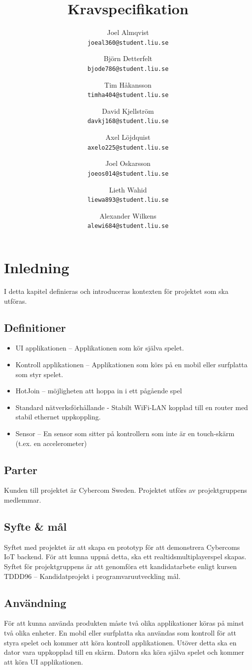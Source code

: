 \documentclass[10pt]{article}
\title{Kravspecifikation}
\author{
    Joel Almqvist\\
    \texttt{joeal360@student.liu.se}
    \and
    Björn Detterfelt\\
    \texttt{bjode786@student.liu.se}
    \and
    Tim Håkansson\\
    \texttt{timha404@student.liu.se}
    \and
    David Kjellström\\
    \texttt{davkj168@student.liu.se}
    \and
    Axel Löjdquist\\
    \texttt{axelo225@student.liu.se}
    \and
    Joel Oskarsson\\
    \texttt{joeos014@student.liu.se}
    \and
    Lieth Wahid\\
    \texttt{liewa893@student.liu.se}
    \and
    Alexander Wilkens\\
    \texttt{alewi684@student.liu.se}
}
\begin{document}
\maketitle
\pagebreak
\tableofcontents
\pagebreak
\section{Inledning}
	I detta kapitel definieras och introduceras kontexten för projektet som ska utföras.

	\subsection{Definitioner}
		\begin{itemize}
		\item UI applikationen -- Applikationen som kör själva spelet.
		\item Kontroll applikationen -- Applikationen som körs på en mobil eller surfplatta som styr spelet.
		\item HotJoin -- möjligheten att hoppa in i ett pågående spel
		\item Standard nätverksförhållande - Stabilt WiFi-LAN kopplad till en router med stabil ethernet uppkoppling.
		\item Sensor -- En sensor som sitter på kontrollern som inte är en touch-skärm (t.ex. en accelerometer)
		\end{itemize}	

	\subsection{Parter}
	Kunden till projektet är Cybercom Sweden. Projektet utförs av projektgruppens medlemmar.
	
	\subsection{Syfte \& mål}
		Syftet med projektet är att skapa en prototyp för att demonstrera Cybercoms IoT backend. För att kunna uppnå detta, ska ett realtidsmultiplayerspel skapas. Syftet för projektgruppens är att genomföra ett kandidatarbete enligt kursen TDDD96 -- Kandidatprojekt i programvaruutveckling mål.
	
	\subsection{Användning}
		För att kunna använda produkten måste två olika applikationer köras på minst två olika enheter. En mobil eller surfplatta ska användas som kontroll för att styra spelet och kommer att köra kontroll applikationen. Utöver detta ska en dator vara uppkopplad till en skärm. Datorn ska köra själva spelet och kommer att köra UI applikationen.  
	
\end{document}
